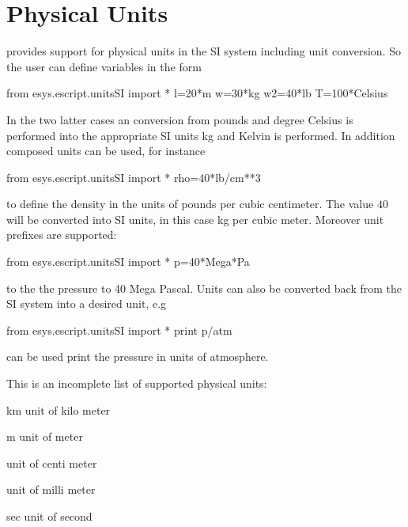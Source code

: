 \section{Physical Units}
\escript provides support for physical units in the SI system  including unit conversion. So the
user can define variables in the form
\begin{python}
from esys.escript.unitsSI import *
l=20*m
w=30*kg
w2=40*lb
T=100*Celsius
\end{python}
In the two latter cases an conversion from pounds and degree Celsius is performed into the appropriate SI units kg and Kelvin is performed. In addition 
composed units can be used, for instance
\begin{python}
from esys.escript.unitsSI import *
rho=40*lb/cm**3
\end{python}
to define the density in the units of pounds per cubic centimeter. The value $40$ will be converted 
into SI units, in this case kg per cubic meter.
Moreover unit prefixes are supported:
\begin{python}
from esys.escript.unitsSI import *
p=40*Mega*Pa
\end{python}
to the the pressure to 40 Mega Pascal. Units can also be converted back from the SI system into
a desired unit, e.g
\begin{python}
from esys.escript.unitsSI import *
print p/atm
\end{python}
can be used print the pressure in units of atmosphere.  

This is an incomplete list of supported physical units:

\begin{datadesc}{km}
unit of kilo meter
\end{datadesc}

\begin{datadesc}{m}
unit of meter
\end{datadesc}

\begin{datadesc}{cm}
unit of centi meter
\end{datadesc}

\begin{datadesc}{mm}
  unit of milli meter
\end{datadesc}

\begin{datadesc}{sec}
 unit of second
\end{datadesc}

